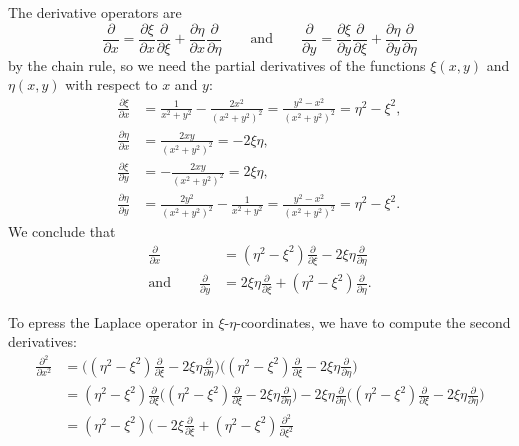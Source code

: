 \begin{loesung}
\begin{teilaufgaben}
\item
The derivative operators are 
\[
\frac{\partial}{\partial x}
=
\frac{\partial\xi}{\partial x}\frac{\partial}{\partial\xi}
+
\frac{\partial\eta}{\partial x}\frac{\partial}{\partial\eta}
\qquad\text{and}\qquad
\frac{\partial}{\partial y}
=
\frac{\partial\xi}{\partial y}\frac{\partial}{\partial\xi}
+
\frac{\partial\eta}{\partial y}\frac{\partial}{\partial\eta}
\]
by the chain rule, so we need the partial derivatives of the functions 
$\xi(x,y)$ and $\eta(x,y)$ with respect to $x$ and $y$:
\begin{align*}
\frac{\partial\xi}{\partial x}
&=
\frac{1}{x^2+y^2}-\frac{2x^2}{(x^2+y^2)^2}
=
\frac{y^2-x^2}{(x^2+y^2)^2}
=
\eta^2-\xi^2,
\\
\frac{\partial\eta}{\partial x}
&=
\frac{2xy}{(x^2+y^2)^2}
=-2\xi\eta,
\\
\frac{\partial\xi}{\partial y}
&=
-
\frac{2xy}{(x^2+y^2)^2}
=2\xi\eta,
\\
\frac{\partial\eta}{\partial y}
&=
\frac{2y^2}{(x^2+y^2)^2}-\frac{1}{x^2+y^2}
=
\frac{y^2-x^2}{(x^2+y^2)^2}
=
\eta^2-\xi^2.
\end{align*}
We conclude that
\begin{align*}
\frac{\partial}{\partial x}
&=
(\eta^2-\xi^2)
\frac{\partial}{\partial\xi}
-
2\xi\eta
\frac{\partial}{\partial\eta}
\\
\text{and}\qquad
\frac{\partial}{\partial y}
&=
2\xi\eta
\frac{\partial}{\partial\xi}
+
(\eta^2-\xi^2)
\frac{\partial}{\partial\eta}.
\end{align*}
\item
To epress the Laplace operator in $\xi$-$\eta$-coordinates, we have
to compute the second derivatives:
\begin{align*}
\frac{\partial^2}{\partial x^2}
&=
\biggl(
(\eta^2-\xi^2)
\frac{\partial}{\partial\xi}
-
2\xi\eta
\frac{\partial}{\partial\eta}
\biggr)
\biggl(
(\eta^2-\xi^2)
\frac{\partial}{\partial\xi}
-
2\xi\eta
\frac{\partial}{\partial\eta}
\biggr)
\\
&=
(\eta^2-\xi^2)\frac{\partial}{\partial\xi}
\biggl(
(\eta^2-\xi^2)
\frac{\partial}{\partial\xi}
-
2\xi\eta
\frac{\partial}{\partial\eta}
\biggr)
-2\xi\eta\frac{\partial}{\partial\eta}
\biggl(
(\eta^2-\xi^2)
\frac{\partial}{\partial\xi}
-
2\xi\eta
\frac{\partial}{\partial\eta}
\biggr)
\\
&=
(\eta^2-\xi^2)\biggl(
-2\xi\frac{\partial}{\partial\xi}
+
(\eta^2-\xi^2)\frac{\partial^2}{\partial\xi^2}

\end{align*}
\end{teilaufgaben}
\end{loesung}
